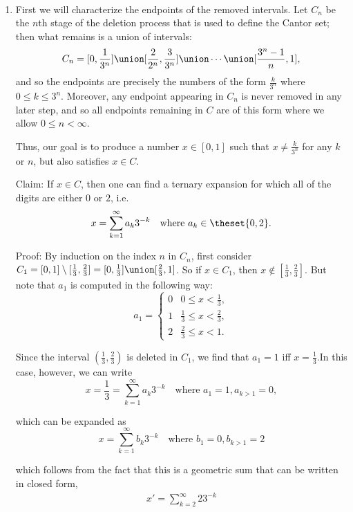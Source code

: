 \begin{solution}\hfill\\
  \begin{enumerate}
    \item First we will characterize the endpoints of the removed intervals. Let $C_n$ be the $n$th stage of the deletion process that is used to define the Cantor set; then what remains is a union of intervals:
      $$
      C_n = [0, \frac 1 {3^n}] \union [\frac 2 {2^n}, \frac 3 {3^n}] \union \cdots \union[\frac {3^n-1} n, 1],
      $$
    and so the endpoints are precisely the numbers of the form $\frac{k}{3^n}$ where $0 \leq k \leq 3^n$. Moreover, any endpoint appearing in $C_n$ is never removed in any later step, and so all endpoints remaining in $C$ are of this form where we allow $0\leq n < \infty$.

    Thus, our goal is to produce a number $x\in [0,1]$ such that $x \neq \frac k {3^n}$ for any $k$ or $n$, but also satisfies $x\in C$.

    Claim: If $x\in C$, then one can find a ternary expansion for which all of the digits are either $0$ or $2$, i.e.
    $$
    x = \sum_{k=1}^\infty a_k 3^{-k} \quad \text{where } a_k \in \theset{0, 2}.
    $$

    Proof: By induction on the index $n$ in $C_n$, first consider $C_1 = [0, 1] \setminus [\frac 1 3, \frac 2 3]= [0, \frac 1 3] \union [\frac 2 3, 1]$. So if $x\in C_1$, then $x\not\in[\frac 1 3, \frac 2 3]$. But note that $a_1$ is computed in the following way:
    $$
    a_1 = \begin{cases}
      0 & 0 \leq x < \frac 1 3, \\
      1 & \frac 1 3 \leq x < \frac 2 3, \\
      2 & \frac 2 3 \leq x < 1.
    \end{cases}
    $$

    Since the interval $(\frac 1 3, \frac 2 3)$ is deleted in $C_1$, we find that $a_1 = 1$ iff $x = \frac 1 3$.In this case, however, we can write
    $$
    x = \frac 1 3 = \sum_{k=1}^\infty a_k 3^{-k} \quad \text{where } a_1 = 1, a_{k>1} = 0,
    $$

    which can be expanded as
    $$
    x = \sum_{k=1}^\infty b_k 3^{-k} \quad\text{where } b_1 = 0, b_{k>1} = 2
    $$

    which follows from the fact that this is a geometric sum that can be written in closed form,
    \begin{align*}
    x' = \sum_{k=2}^\infty 2 3^{-k}
  \end{align*}

  \end{enumerate}
\end{solution}
